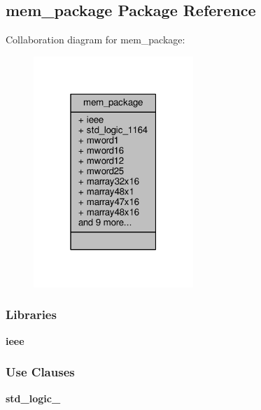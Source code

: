 \subsection{mem\+\_\+package Package Reference}
\label{classmem__package}


Collaboration diagram for mem\+\_\+package\+:\nopagebreak
\begin{figure}[H]
\begin{center}
\leavevmode
\includegraphics[width=171pt]{dd/dc4/classmem__package__coll__graph}
\end{center}
\end{figure}
\subsubsection*{Libraries}
 \begin{DoxyCompactItemize}
\item 
{\bf ieee} 
\end{DoxyCompactItemize}
\subsubsection*{Use Clauses}
 \begin{DoxyCompactItemize}
\item 
{\bf std\+\_\+logic\+\_}   
\end{DoxyCompactItemize}

